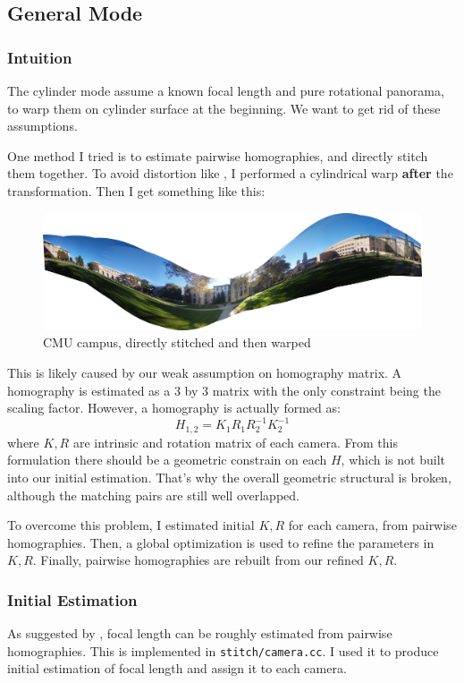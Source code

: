 
\subsection{General Mode}
\subsubsection{Intuition}
The cylinder mode assume a known focal length and pure rotational panorama, to
warp them on cylinder surface at the beginning.
We want to get rid of these assumptions.

One method I tried is to estimate pairwise homographies,
and directly stitch them together. To avoid distortion like ,
I performed a cylindrical warp \textbf{after} the transformation.
Then I get something like this:
\begin{figure}[H]
  \centering
  \includegraphics[width=1\textwidth]{res/CMU1-noestimate.jpg}
  \caption{CMU campus, directly stitched and then warped}
\end{figure}

This is likely caused by our weak assumption on homography matrix.
A homography is estimated as a 3 by 3 matrix with the only
constraint being the scaling factor. However,
a homography is actually formed as:
\[ H_{1,2} = K_1R_1R_2^{-1}K_2^{-1}\]
where $K,R$ are intrinsic and rotation matrix of each camera.
From this formulation there should be a geometric constrain on each $H$,
which is not built into our initial estimation.
That's why the overall geometric structural is broken, although the matching pairs
are still well overlapped.

To overcome this problem, I estimated initial $K, R$ for each camera, from pairwise homographies.
Then, a global optimization is used to refine the parameters in $K, R$.
Finally, pairwise homographies are rebuilt from our refined $K, R$.

\subsubsection{Initial Estimation}
As suggested by \cite{focal}, focal length
can be roughly estimated from pairwise homographies. This is implemented in \verb|stitch/camera.cc|.
I used it to produce initial estimation of
focal length and assign it to each camera.

